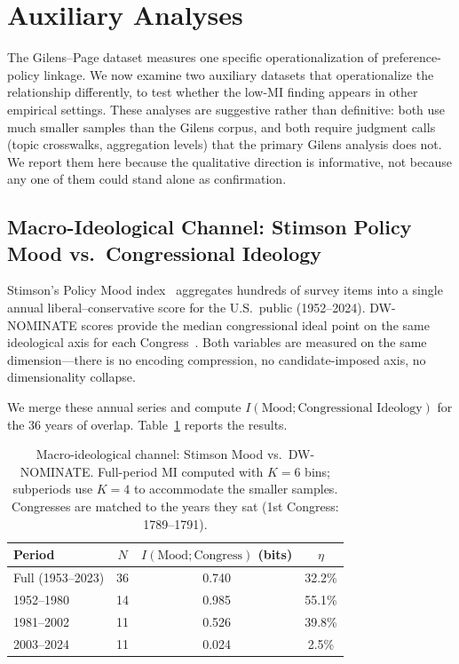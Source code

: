 \documentclass[twocolumn,10pt]{article}
\begin{document}
\section{Auxiliary Analyses}
\label{sec:validation}

The Gilens--Page dataset measures one specific operationalization of preference-policy linkage.  We now examine two auxiliary datasets that operationalize the relationship differently, to test whether the low-MI finding appears in other empirical settings.  These analyses are suggestive rather than definitive: both use much smaller samples than the Gilens corpus, and both require judgment calls (topic crosswalks, aggregation levels) that the primary Gilens analysis does not.  We report them here because the qualitative direction is informative, not because any one of them could stand alone as confirmation.

\subsection{Macro-Ideological Channel: Stimson Policy Mood vs.\ Congressional Ideology}

Stimson's Policy Mood index~\citep{stimson2004} aggregates hundreds of survey items into a single annual liberal--conservative score for the U.S.\ public (1952--2024).  DW-NOMINATE scores provide the median congressional ideal point on the same ideological axis for each Congress~\citep{poole1985}.  Both variables are measured on the same dimension---there is no encoding compression, no candidate-imposed axis, no dimensionality collapse.

We merge these annual series and compute $I(\text{Mood}; \text{Congressional Ideology})$ for the 36 years of overlap.  Table~\ref{tab:stimson} reports the results.

\begin{table}[t]
\centering
\caption{Macro-ideological channel: Stimson Mood vs.\ DW-NOMINATE.  Full-period MI computed with $K=6$ bins; subperiods use $K=4$ to accommodate the smaller samples.  Congresses are matched to the years they sat (1st Congress: 1789--1791).}
\label{tab:stimson}
\begin{tabular}{@{}lccc@{}}
\toprule
Period & $N$ & $I(\text{Mood}; \text{Congress})$ (bits) & $\eta$ \\
\midrule
Full (1953--2023) & 36 & 0.740 & 32.2\% \\
\midrule
1952--1980 & 14 & 0.985 & 55.1\% \\
1981--2002 & 11 & 0.526 & 39.8\% \\
2003--2024 & 11 & 0.024 & 2.5\% \\
\bottomrule
\end{tabular}
\end{table}
\end{document}
